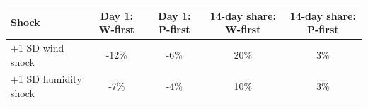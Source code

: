 \begin{tabular}{|l|c|c|c|c|}
\hline
\textbf{Shock} & \textbf{Day 1: W-first} & \textbf{Day 1: P-first} & \textbf{14-day share: W-first} & \textbf{14-day share: P-first} \\\hline
+1 SD wind shock & -12\% & -6\% & 20\% & 3\% \\\hline
+1 SD humidity shock & -7\% & -4\% & 10\% & 3\% \\\hline
\end{tabular}
